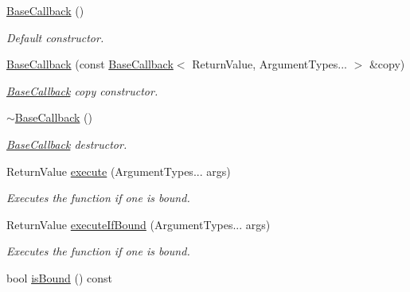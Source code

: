 \begin{DoxyCompactItemize}
\item 
\mbox{\hyperlink{class_arcana_1_1_base_callback_a79731f710c224094f56afe210315ec05}{Base\+Callback}} ()
\begin{DoxyCompactList}\small\item\em Default constructor. \end{DoxyCompactList}\item 
\mbox{\hyperlink{class_arcana_1_1_base_callback_a0a3da87cf8bd61e627dd76a7b23ab897}{Base\+Callback}} (const \mbox{\hyperlink{class_arcana_1_1_base_callback}{Base\+Callback}}$<$ Return\+Value, Argument\+Types... $>$ \&copy)
\begin{DoxyCompactList}\small\item\em \mbox{\hyperlink{class_arcana_1_1_base_callback}{Base\+Callback}} copy constructor. \end{DoxyCompactList}\item 
\mbox{\label{class_arcana_1_1_base_callback_a7a85b48293ed2d2f8793e358f79d8d6c}} 
\mbox{\hyperlink{class_arcana_1_1_base_callback_a7a85b48293ed2d2f8793e358f79d8d6c}{$\sim$\+Base\+Callback}} ()
\begin{DoxyCompactList}\small\item\em \mbox{\hyperlink{class_arcana_1_1_base_callback}{Base\+Callback}} destructor. \end{DoxyCompactList}\item 
Return\+Value \mbox{\hyperlink{class_arcana_1_1_base_callback_ab9cba864f0037c3125ff1b5ea7a33a08}{execute}} (Argument\+Types... args)
\begin{DoxyCompactList}\small\item\em Executes the function if one is bound. \end{DoxyCompactList}\item 
Return\+Value \mbox{\hyperlink{class_arcana_1_1_base_callback_a7ab7b46a89bf248c4ee798e34f1b626d}{execute\+If\+Bound}} (Argument\+Types... args)
\begin{DoxyCompactList}\small\item\em Executes the function if one is bound. \end{DoxyCompactList}\item 
\mbox{\label{class_arcana_1_1_base_callback_a15c42c877e4973d18674ce03ba2e0009}} 
bool \mbox{\hyperlink{class_arcana_1_1_base_callback_a15c42c877e4973d18674ce03ba2e0009}{is\+Bound}} () const

\end{DoxyCompactItemize}
